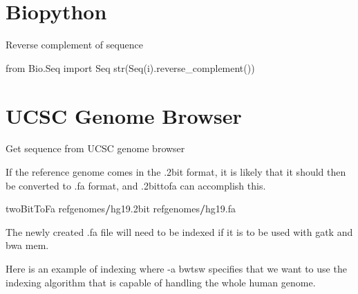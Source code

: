 \documentclass[]{book}
\newenvironment{Shaded}{\begin{snugshade}}{\end{snugshade}}
\newcommand{\BuiltInTok}[1]{#1}
\newcommand{\FloatTok}[1]{\textcolor[rgb]{0.00,0.00,0.81}{#1}}
\newcommand{\ImportTok}[1]{#1}
\newcommand{\NormalTok}[1]{#1}
\newcommand{\OperatorTok}[1]{\textcolor[rgb]{0.81,0.36,0.00}{\textbf{#1}}}
\newcommand{\SpecialCharTok}[1]{\textcolor[rgb]{0.00,0.00,0.00}{#1}}
\newcommand{\StringTok}[1]{\textcolor[rgb]{0.31,0.60,0.02}{#1}}
\newcommand{\VariableTok}[1]{\textcolor[rgb]{0.00,0.00,0.00}{#1}}
\begin{document}
\hypertarget{biopython}{%
\section{Biopython}\label{biopython}}

Reverse complement of sequence

\begin{Shaded}
\begin{Highlighting}[]
\ImportTok{from}\NormalTok{ Bio.Seq }\ImportTok{import}\NormalTok{ Seq}
\BuiltInTok{str}\NormalTok{(Seq(i).reverse_complement())}
\end{Highlighting}
\end{Shaded}

\hypertarget{ucsc-genome-browser}{%
\section{UCSC Genome Browser}\label{ucsc-genome-browser}}

Get sequence from UCSC genome browser

\begin{Shaded}
\end{Shaded}

If the reference genome comes in the .2bit format, it is likely that it should then be converted to .fa format, and .2bittofa can accomplish this.

\begin{Shaded}
\begin{Highlighting}[]
\NormalTok{twoBitToFa refgenomes}\OperatorTok{/}\NormalTok{hg19}\FloatTok{.2}\NormalTok{bit refgenomes}\OperatorTok{/}\NormalTok{hg19.fa}
\end{Highlighting}
\end{Shaded}

The newly created .fa file will need to be indexed if it is to be used with gatk and bwa mem.

Here is an example of indexing where -a bwtsw specifies that we want to use the indexing algorithm that is capable of handling the whole human genome.
\end{document}
